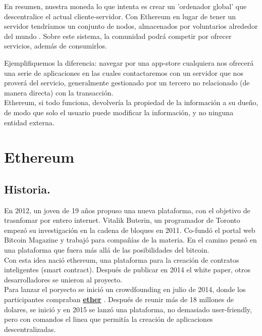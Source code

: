 \documentclass[11pt,a4paper]{article}
\begin{document}
En resumen, nuestra moneda lo que intenta es crear un 'ordenador  global' que descentralice el actual cliente-servidor. Con Ethereum en lugar de tener un servidor tendríamos un conjunto de nodos, almacenados por voluntarios alrededor del mundo . Sobre este sistema, la comunidad podrá competir por ofrecer servicios, además de consumirlos.


Ejemplifiquemos la diferencia: navegar por una app-store cualquiera nos ofrecerá una serie de aplicaciones en las cuales contactaremos con un servidor que nos proverá del servicio, generalmente gestionado por un tercero no relacionado (de manera directa) con la transacción.\\

Ethereum, si todo funciona, devolvería la propiedad de la información a su dueño, de modo que solo el usuario puede modificar la información, y no ninguna entidad externa.\\



\section{Ethereum\\}


\subsection{Historia.}
	En 2012, un joven de 19 años propuso una nueva plataforma, con el objetivo de trasnfomar por entero internet. Vitalik Buterin, un programador de Toronto empezó su investigación en la cadena de bloques en 2011. Co-fundó el portal web Bitcoin Magazine y trabajó para compañías de la materia. En el camino pensó en una plataforma que fuera más allá de las posibilidades del bitcoin.\\
	
	Con esta idea nació ethereum, una plataforma para la creación de contratos inteligentes (smart contract). Después de publicar en 2014 el white paper, otros desarrolladores se unieron al proyecto. \\

	Para lanzar el poryecto se inició un crowdfounding en julio de 2014, donde los participantes compraban \hyperref[sec:ether]{\textbf{\underline{ether}}} . Después de reunir más de 18 millones de dolares, se inició y en 2015 se lanzó una plataforma, no demasiado user-friendly, pero con comandos el linea que permitía la creación de aplicaciones descentralizadas.\\
\end{document}
